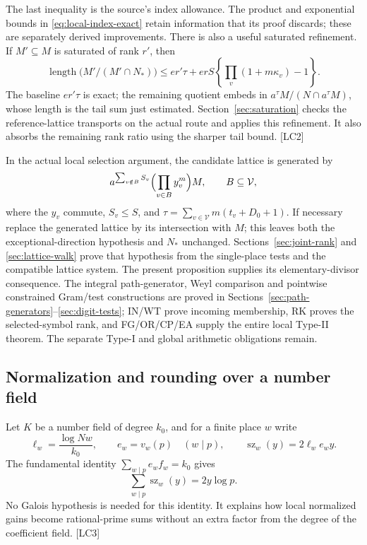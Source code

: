 \documentclass[11pt,a4paper]{article}
\numberwithin{equation}{section}
\theoremstyle{remark}\newtheorem{remark}[theorem]{Remark}
\begin{document}
The last inequality is the source's index allowance. The product and exponential bounds in \eqref{eq:local-index-exact} retain information that its proof discards; these are separately derived improvements. There is also a useful saturated refinement. If $M'\subseteq M$ is saturated of rank $r'$, then
\[
\operatorname{length}\bigl(M'/(M'\cap N_*)\bigr)
\le er'\tau+erS\left\{\prod_v(1+m\kappa_v)-1\right\}.
\]
The baseline $er'\tau$ is exact; the remaining quotient embeds in $a^\tau M/(N\cap a^\tau M)$, whose length is the tail sum just estimated. Section~\ref{sec:saturation} checks the reference-lattice transports on the actual route and applies this refinement. It also absorbs the remaining rank ratio using the sharper tail bound. \textsf{[LC2]}

In the actual local selection argument, the candidate lattice is generated by
\[
a^{\sum_{v\notin B}S_v}\Bigl(\prod_{v\in B}y_v^m\Bigr)M,
\qquad B\subseteq\mathcal V,
\]
where the $y_v$ commute, $S_v\le S$, and
$\tau=\sum_{v\in\mathcal V}m(t_v+D_0+1)$. If necessary replace the generated lattice by its intersection with $M$; this leaves both the exceptional-direction hypothesis and $N_*$ unchanged. Sections~\ref{sec:joint-rank} and \ref{sec:lattice-walk} prove that hypothesis from the single-place tests and the compatible lattice system. The present proposition supplies its elementary-divisor consequence. The integral path-generator, Weyl comparison and pointwise constrained Gram/test constructions are proved in Sections~\ref{sec:path-generators}--\ref{sec:digit-tests}; IN/WT prove incoming membership, RK proves the selected-symbol rank, and FG/OR/CP/EA supply the entire local Type-II theorem. The separate Type-I and global arithmetic obligations remain.\cite{local-systems}

\subsection{Normalization and rounding over a number field}

Let $K$ be a number field of degree $k_0$, and for a finite place $w$ write
\[
\ell_w=\frac{\log Nw}{k_0},\qquad e_w=v_w(p)\quad(w\mid p),
\qquad \operatorname{sz}_w(y)=2\ell_w e_w y.
\]
The fundamental identity $\sum_{w\mid p}e_w f_w=k_0$ gives
\begin{equation}\label{eq:prime-normalization}
\sum_{w\mid p}\operatorname{sz}_w(y)=2y\log p.
\end{equation}
No Galois hypothesis is needed for this identity. It explains how local normalized gains become rational-prime sums without an extra factor from the degree of the coefficient field. \textsf{[LC3]}\cite{local-normalization}
\end{document}
